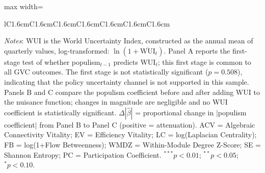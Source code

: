 \begin{table}[!htbp]
\begin{adjustbox}{max width=\textwidth}
\begin{tabular}{lC{1.6cm}C{1.6cm}C{1.6cm}C{1.6cm}C{1.6cm}C{1.6cm}C{1.6cm}}
\bottomrule
\end{tabular}
\end{adjustbox}
\vspace{4pt}
\begin{minipage}{\textwidth}
\footnotesize
\textit{Notes}: WUI is the World Uncertainty Index, constructed as the annual mean of quarterly values, log-transformed: $\ln(1+\overline{\text{WUI}}_t)$. Panel A reports the first-stage test of whether populism$_{t-1}$ predicts WUI$_t$; this first stage is common to all GVC outcomes. The first stage is not statistically significant ($p=0.508$), indicating that the policy uncertainty channel is not supported in this sample. Panels B and C compare the populism coefficient before and after adding WUI to the nuisance function; changes in magnitude are negligible and no WUI coefficient is statistically significant. $\Delta|\hat{\beta}|$ = proportional change in $|$populism coefficient$|$ from Panel B to Panel C (positive = attenuation). ACV = Algebraic Connectivity Vitality; EV = Efficiency Vitality; LC = log(Laplacian Centrality); FB = log(1+Flow Betweenness); WMDZ = Within-Module Degree Z-Score; SE = Shannon Entropy; PC = Participation Coefficient. $^{***}p<0.01$; $^{**}p<0.05$; $^{*}p<0.10$.
\end{minipage}
\end{table}
